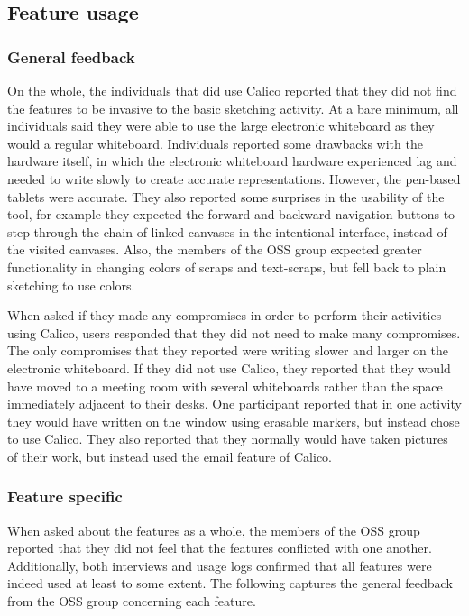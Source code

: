 \subsection{Feature usage}
\label{chapter:evaluation:deployment1:part1}

\subsubsection{General feedback}

On the whole, the individuals that did use Calico reported that they did not find the features to be invasive to the basic sketching activity. At a bare minimum, all individuals said they were able to use the large electronic whiteboard as they would a regular whiteboard. Individuals reported some drawbacks with the hardware itself, in which the electronic whiteboard hardware experienced lag and needed to write slowly to create accurate representations. However, the pen-based tablets were accurate. They also reported some surprises in the usability of the tool, for example they expected the forward and backward navigation buttons to step through the chain of linked canvases in the intentional interface, instead of the visited canvases. Also, the members of the OSS group expected greater functionality in changing colors of scraps and text-scraps, but fell back to plain sketching to use colors.

When asked if they made any compromises in order to perform their activities using Calico, users responded that they did not need to make many compromises. The only compromises that they reported were writing slower and larger on the electronic whiteboard. If they did not use Calico, they reported that they would have moved to a meeting room with several whiteboards rather than the space immediately adjacent to their desks. One participant reported that in one activity they would have written on the window using erasable markers, but instead chose to use Calico. They also reported that they normally would have taken pictures of their work, but instead used the email feature of Calico.

\subsubsection{Feature specific}

When asked about the features as a whole, the members of the OSS group reported that they did not feel that the features conflicted with one another. Additionally, both interviews and usage logs confirmed that all features were indeed used at least to some extent. The following captures the general feedback from the OSS group concerning each feature.

